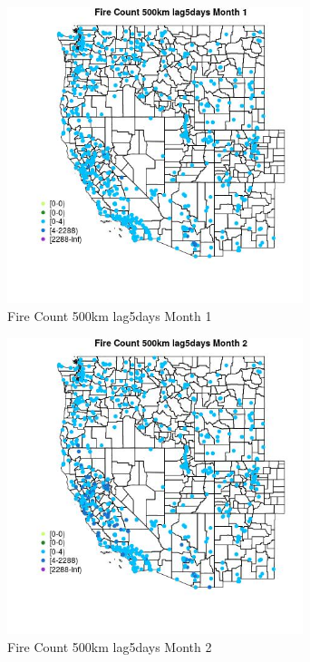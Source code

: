 \begin{figure} 
\centering  
\includegraphics[width=0.77\textwidth]{Code_Outputs/Report_ML_input_PM25_Step4_part_e_de_duplicated_aves_compiled_2019-05-21wNAs_MapObsMo1Fire_Count_500km_lag5days.jpg} 
\caption{\label{fig:Report_ML_input_PM25_Step4_part_e_de_duplicated_aves_compiled_2019-05-21wNAsMapObsMo1Fire_Count_500km_lag5days}Fire Count 500km lag5days Month 1} 
\end{figure} 
 

\clearpage 

\begin{figure} 
\centering  
\includegraphics[width=0.77\textwidth]{Code_Outputs/Report_ML_input_PM25_Step4_part_e_de_duplicated_aves_compiled_2019-05-21wNAs_MapObsMo2Fire_Count_500km_lag5days.jpg} 
\caption{\label{fig:Report_ML_input_PM25_Step4_part_e_de_duplicated_aves_compiled_2019-05-21wNAsMapObsMo2Fire_Count_500km_lag5days}Fire Count 500km lag5days Month 2} 
\end{figure} 
 

